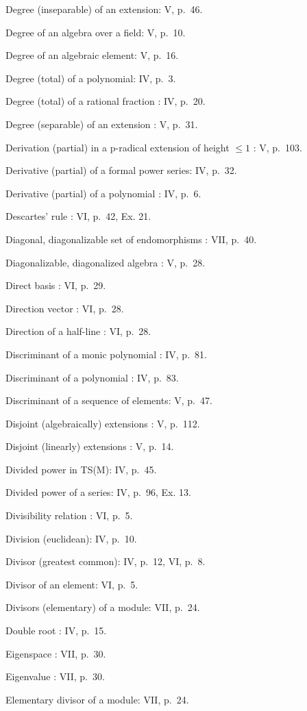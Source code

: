 Degree (inseparable) of an extension: V, p.~46.

Degree of an algebra over a field: V, p.~10.

Degree of an algebraic element: V, p.~16.

Degree (total) of a polynomial: IV, p.~3.

Degree (total) of a rational fraction : IV, p.~20.

Degree (separable) of an extension : V, p.~31.

Derivation (partial) in a p-radical extension of height \(\leqslant 1\) : V, p.~103.

Derivative (partial) of a formal power series: IV, p.~32.

Derivative (partial) of a polynomial : IV, p.~6.

Descartes' rule : VI, p.~42, Ex. 21.

Diagonal, diagonalizable set of endomorphisms : VII, p.~40.

Diagonalizable, diagonalized algebra : V, p.~28.

Direct basis : VI, p.~29.

Direction vector : VI, p.~28.

Direction of a half-line : VI, p.~28.

Discriminant of a monic polynomial : IV, p.~81.

Discriminant of a polynomial : IV, p.~83.

Discriminant of a sequence of elements: V, p.~47.

Disjoint (algebraically) extensions : V, p.~112.

Disjoint (linearly) extensions : V, p.~14.

Divided power in TS(M): IV, p.~45.

Divided power of a series: IV, p.~96, Ex. 13.

Divisibility relation : VI, p.~5.

Division (euclidean): IV, p.~10.

Divisor (greatest common): IV, p.~12, VI, p.~8.

Divisor of an element: VI, p.~5.

Divisors (elementary) of a module: VII, p.~24.

Double root : IV, p.~15.

Eigenspace : VII, p.~30.

Eigenvalue : VII, p.~30.

Elementary divisor of a module: VII, p.~24.

